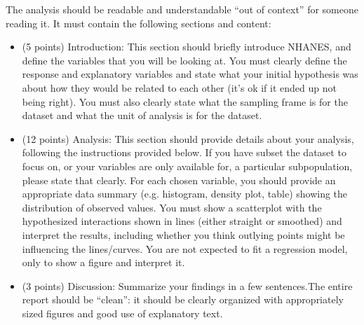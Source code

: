 \documentclass{article}\usepackage[]{graphicx}\usepackage[]{color}
\begin{document}
The analysis should be readable and understandable ``out of context'' for someone reading it. It must contain the following sections and content:

\begin{itemize}
    \item (5 points) Introduction: This section should briefly introduce NHANES, and define the variables that you will be looking at. You must clearly define the response and explanatory variables and state what your initial hypothesis was about how they would be related to each other (it's ok if it ended up not being right). You must also clearly state what the sampling frame is for the dataset and what the unit of analysis is for the dataset.
    \item (12 points) Analysis: This section should provide details about your analysis, following the instructions provided below. If you have subset the dataset to focus on, or your variables are only available for, a particular subpopulation, please state that clearly. For each chosen variable, you should provide an appropriate data summary (e.g. histogram, density plot, table) showing the distribution of observed values. You must show a scatterplot with the hypothesized interactions shown in lines (either straight or smoothed) and interpret the results, including whether you think outlying points might be influencing the lines/curves. You are not expected to fit a regression model, only to show a figure and interpret it. 
    \item (3 points) Discussion: Summarize your findings in a few sentences.The entire report should be ``clean'': it should be clearly organized with appropriately sized figures and good use of explanatory text.
\end{itemize}
\end{document}
